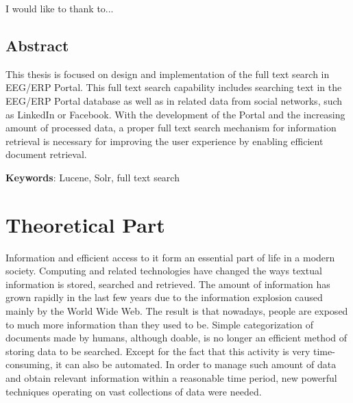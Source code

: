 \documentclass[12pt, oneside, a4paper]{book}
\begin{document}
I would like to thank to...

\pagebreak{}


\thispagestyle{empty}


\chapter*{Abstract}


This thesis is focused on design and implementation of the full text search in EEG/ERP Portal. 
This full text search capability includes searching text in the EEG/ERP Portal database as well as in related data from social networks, such as LinkedIn or Facebook. 
With the development of the Portal and the increasing amount of processed data, a proper full text search mechanism for information retrieval is necessary for improving the user experience by enabling efficient do\-cu\-ment retrieval. 

\pagebreak{}

{\bf Keywords}:
Lucene, Solr, full text search

\thispagestyle{empty}

\vfill\eject

\tableofcontents

\mainmatter

\pagestyle{plain}





\part{Theoretical Part}

Information and efficient access to it form an essential part of life in a modern society. 
Computing and related technologies have changed the ways textual information is stored, searched and retrieved. 
The amount of information has grown rapidly in the last few years due to the information explosion caused mainly by the World Wide Web. 
The result is that nowadays, people are exposed to much more information than they used to be. 
Simple categorization of documents made by humans, although doable, is no longer an efficient method of storing data to be searched. 
Except for the fact that this activity is very time-consuming, it can also be automated. 
In order to manage such amount of data and obtain relevant information within a reasonable time period, new powerful techniques operating on vast collections of data were needed.
\end{document}
